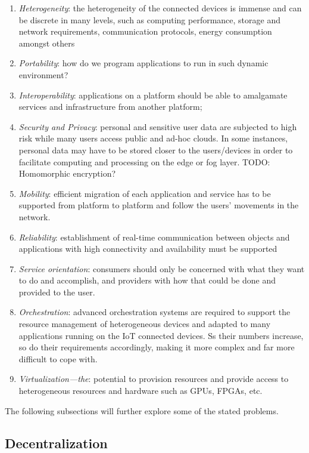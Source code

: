 \documentclass{ieeeaccess}
\begin{document}
\begin{enumerate}
    \item \emph{Heterogeneity}: the heterogeneity of the connected devices is immense and can be discrete in many levels, such as computing performance, storage and network requirements, communication protocols, energy consumption amongst others
    \item \emph{Portability}: how do we program applications to run in such dynamic environment?
    \item \emph{Interoperability}: applications on a platform should be able to amalgamate services and infrastructure from another platform;
    \item \emph{Security and Privacy}: personal and sensitive user data are subjected to high risk while many users access public and ad-hoc clouds. In some instances, personal data may have to be stored closer to the users/devices in order to facilitate computing and processing on the edge or fog layer. TODO: Homomorphic encryption?
    \item \emph{Mobility}: efficient migration of each application and service has to be supported from platform to platform and follow the users’ movements in the network.
    \item \emph{Reliability}: establishment of real-time communication between objects and applications with high connectivity and availability must be supported
    \item \emph{Service orientation}: consumers should only be concerned with what they want to do and accomplish, and providers with how that could be done and provided to the user.
    \item \emph{Orchestration}: advanced orchestration systems are required to support the resource management of heterogeneous devices and adapted to many applications running on the IoT connected devices. Ss their numbers increase, so do their requirements accordingly, making it more complex and far more difficult to cope with.
    \item \emph{Virtualization—the}: potential to provision resources and provide access to heterogeneous resources and hardware such as GPUs, FPGAs, etc.
\end{enumerate}

The following subsections will further explore some of the stated problems.

\subsection{Decentralization}
\end{document}

